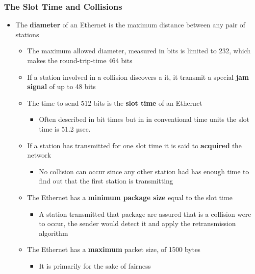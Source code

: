 \documentclass[11pt]{article}
\providecommand{\tightlist}{%
      \setlength{\itemsep}{0pt}\setlength{\parskip}{0pt}}
\begin{document}
    \subsubsection{The Slot Time and
Collisions}\label{the-slot-time-and-collisions}

\begin{itemize}
\tightlist
\item
  The \textbf{diameter} of an Ethernet is the maximum distance between
  any pair of stations

  \begin{itemize}
  \tightlist
  \item
    The maximum allowed diameter, measured in bits is limited to 232,
    which makes the round-trip-time 464 bits
  \item
    If a station involved in a collision discovers a it, it transmit a
    special \textbf{jam signal} of up to 48 bits
  \item
    The time to send 512 bits is the \textbf{slot time} of an Ethernet

    \begin{itemize}
    \tightlist
    \item
      Often described in bit times but in in conventional time units the
      slot time is 51.2 µsec.
    \end{itemize}
  \item
    If a station has transmitted for one slot time it is said to
    \textbf{acquired} the network

    \begin{itemize}
    \tightlist
    \item
      No collision can occur since any other station had has enough time
      to find out that the first station is transmitting
    \end{itemize}
  \item
    The Ethernet has a \textbf{minimum package size} equal to the slot
    time

    \begin{itemize}
    \tightlist
    \item
      A station transmitted that package are assured that is a collision
      were to occur, the sender would detect it and apply the
      retransmission algorithm
    \end{itemize}
  \item
    The Ethernet has a \textbf{maximum} packet size, of 1500 bytes

    \begin{itemize}
    \tightlist
    \item
      It is primarily for the sake of fairness
    \end{itemize}
  \end{itemize}
\end{itemize}
\end{document}
